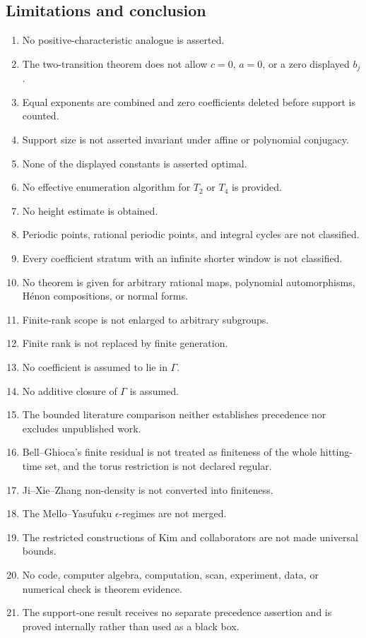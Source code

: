 \documentclass[11pt]{article}
\theoremstyle{definition}
\begin{document}
\subsection{Limitations and conclusion}

\begin{enumerate}
\item No positive-characteristic analogue is asserted.
\item The two-transition theorem does not allow \(c=0\), \(a=0\), or a zero displayed \(b_j\).
\item Equal exponents are combined and zero coefficients deleted before support is counted.
\item Support size is not asserted invariant under affine or polynomial conjugacy.
\item None of the displayed constants is asserted optimal.
\item No effective enumeration algorithm for \(T_2\) or \(T_4\) is provided.
\item No height estimate is obtained.
\item Periodic points, rational periodic points, and integral cycles are not classified.
\item Every coefficient stratum with an infinite shorter window is not classified.
\item No theorem is given for arbitrary rational maps, polynomial automorphisms, Hénon compositions, or normal forms.
\item Finite-rank scope is not enlarged to arbitrary subgroups.
\item Finite rank is not replaced by finite generation.
\item No coefficient is assumed to lie in \(\Gamma\).
\item No additive closure of \(\Gamma\) is assumed.
\item The bounded literature comparison neither establishes precedence nor excludes unpublished work.
\item Bell--Ghioca's finite residual is not treated as finiteness of the whole hitting-time set, and the torus restriction is not declared regular.
\item Ji--Xie--Zhang non-density is not converted into finiteness.
\item The Mello--Yasufuku \(\epsilon\)-regimes are not merged.
\item The restricted constructions of Kim and collaborators are not made universal bounds.
\item No code, computer algebra, computation, scan, experiment, data, or numerical check is theorem evidence.
\item The support-one result receives no separate precedence assertion and is proved internally rather than used as a black box.
\end{enumerate}
\end{document}

